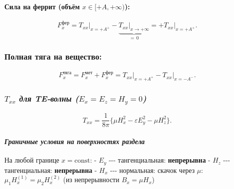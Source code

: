 \documentclass[11pt]{article}
\begin{document}
\paragraph{\texorpdfstring{Сила на феррит (объём
\(x\in[+A,+\infty)\)):}{Сила на феррит (объём x\textbackslash{}in{[}+A,+\textbackslash{}infty)):}}\label{ux441ux438ux43bux430-ux43dux430-ux444ux435ux440ux440ux438ux442-ux43eux431ux44aux451ux43c-xinainfty}

\begin{equation*}
    F_x^{\text{фер}} = T_{xx}\big|_{x=+A^+}
                     - \underbrace{T_{xx}\big|_{x\to+\infty}}_{=\,0}
    = +T_{xx}\big|_{x=+A^+}.
\end{equation*}

\subsubsection{Полная тяга на
вещество:}\label{ux43fux43eux43bux43dux430ux44f-ux442ux44fux433ux430-ux43dux430-ux432ux435ux449ux435ux441ux442ux432ux43e}

\begin{equation*}
    F_x^{\text{тяга}} = F_x^{\text{мет}} + F_x^{\text{фер}}
    = T_{xx}\big|_{x=+A^+} - T_{xx}\big|_{x=-A^-}.
\end{equation*}

\subsubsection{\texorpdfstring{\emph{\(T_{xx}\) для TE-волны
(\(E_x=E_z=H_y=0\))}}{T\_\{xx\} для TE-волны (E\_x=E\_z=H\_y=0)}}\label{t_xx-ux434ux43bux44f-te-ux432ux43eux43bux43dux44b-e_xe_zh_y0}

\begin{equation*}
    T_{xx} = \frac{1}{8\pi}\bigl\{
        \mu H_x^2 - \varepsilon E_y^2 - \mu H_z^2
    \bigr\}.
\end{equation*}

\paragraph{\texorpdfstring{\emph{Граничные условия на поверхностях
раздела}}{Граничные условия на поверхностях раздела}}\label{ux433ux440ux430ux43dux438ux447ux43dux44bux435-ux443ux441ux43bux43eux432ux438ux44f-ux43dux430-ux43fux43eux432ux435ux440ux445ux43dux43eux441ux442ux44fux445-ux440ux430ux437ux434ux435ux43bux430}

На любой границе \(x = \mathrm{const}\): - \(E_y\) -\/-\/-
тангенциальная: \textbf{непрерывна} - \(H_z\) -\/-\/- тангенциальная:
\textbf{непрерывна} - \(H_x\) -\/-\/- нормальная: скачок через \(\mu\):
\(\mu_1 H_x^{(1)} = \mu_2 H_x^{(2)}\) (из непрерывности
\(B_x = \mu H_x\))
\end{document}
